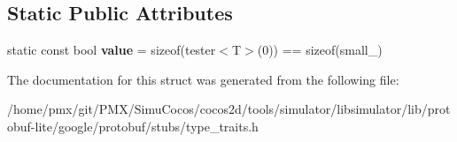 \subsection*{Static Public Attributes}
\begin{DoxyCompactItemize}
\item 
\mbox{\label{structgoogle_1_1protobuf_1_1internal_1_1internal_1_1is__class__or__union_a421d65e75283011ed2e8205fa0c6404a}} 
static const bool {\bfseries value} = sizeof(tester$<$T$>$(0)) == sizeof(small\+\_\+)
\end{DoxyCompactItemize}


The documentation for this struct was generated from the following file\+:\begin{DoxyCompactItemize}
\item 
/home/pmx/git/\+P\+M\+X/\+Simu\+Cocos/cocos2d/tools/simulator/libsimulator/lib/protobuf-\/lite/google/protobuf/stubs/type\+\_\+traits.\+h\end{DoxyCompactItemize}
